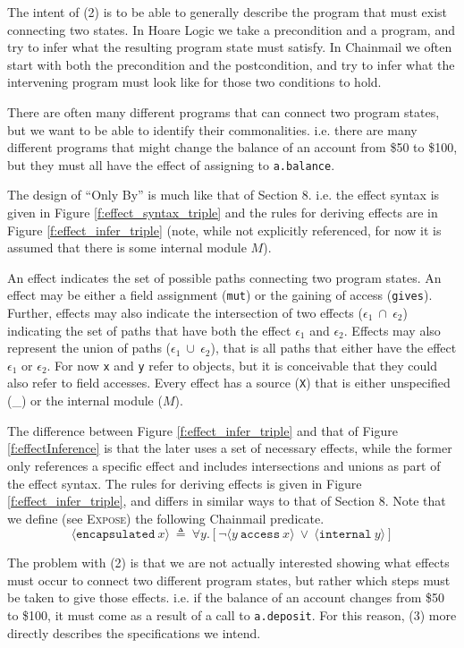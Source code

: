 \documentclass[12pt]{article}
\begin{document}
The intent of (2) is to be able to generally describe the program that must exist connecting two states. 
In Hoare Logic we take a precondition and a program, and try to infer what the resulting program state must 
satisfy. In Chainmail we often start with both the precondition and the postcondition, and try to infer
what the intervening program must look like for those two conditions to hold.

There are often many different programs that can connect two program states, but we want to be able to 
identify their commonalities. i.e. there are many different programs that might change the balance of an 
account from \$50 to \$100, but they must all have the effect of assigning to \verb|a.balance|.

The design of ``Only By'' is much like that of Section 8. i.e. the effect syntax is given in Figure \ref{f:effect_syntax_triple}
and the rules for deriving effects are in Figure \ref{f:effect_infer_triple} (note, while not explicitly 
referenced, for now it is assumed that there is some internal module $M$).

 An effect indicates 
the set of possible paths connecting two program states. An effect may be either a field assignment (\texttt{mut}) or
the gaining of access (\texttt{gives}). Further, effects may also indicate the intersection of two effects ($\epsilon_1\ \cap\ \epsilon_2$)
indicating the set of paths that have both the effect $\epsilon_1$ and $\epsilon_2$. Effects may also
represent the union of paths ($\epsilon_1\ \cup\ \epsilon_2$), that is all paths that either have the effect 
$\epsilon_1$ or $\epsilon_2$. For now \texttt{x} and \texttt{y} refer to objects, but it is conceivable that they
could also refer to field accesses.
Every effect has a source (\texttt{X}) that is either unspecified (\_) or 
the internal module ($M$).

The difference between Figure \ref{f:effect_infer_triple} and that of Figure \ref{f:effectInference}
is that the later uses a set of necessary effects, while the former only references a specific effect
and includes intersections and unions as part of the effect syntax.
The rules for deriving effects is given in Figure \ref{f:effect_infer_triple},
and differs in similar ways to that of Section 8. 
Note that we define (see \textsc{Expose}) the following Chainmail predicate.
$$\langle \texttt{encapsulated}\ x\rangle\ \triangleq\ 
\forall y.[\neg\langle y\ \texttt{access}\ x \rangle\ \vee\ \langle \texttt{internal}\ y \rangle]$$

The problem with (2) is that we are not actually interested showing what effects must occur to 
connect two different program states, but rather which steps must be taken to give those effects.
i.e. if the balance of an account changes from \$50 to \$100, it must come as a result of a call to 
\verb|a.deposit|. For this reason, (3) more directly describes the specifications we intend.
\end{document}
